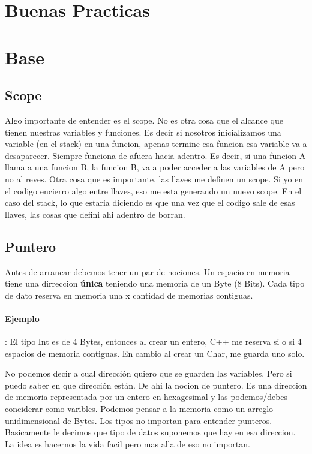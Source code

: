 \documentclass[11pt]{article}
\begin{document}
\tableofcontents
\section{Buenas Practicas}
\section{Base}
\subsection{Scope}
Algo importante de entender es el scope.
No es otra cosa que el alcance que tienen nuestras variables y funciones.
Es decir si nosotros inicializamos una variable (en el stack) en una funcion,
apenas termine esa funcion esa variable va a desaparecer.
Siempre funciona de afuera hacia adentro.
Es decir, si una funcion A llama a una funcion B, la funcion B, va a poder
acceder a las variables de A pero no al reves.
Otra cosa que es importante, las llaves {}  me definen un scope.
Si yo en el codigo encierro algo entre llaves, eso me esta generando un nuevo scope.
En el caso del stack, lo que estaria diciendo es que una vez que el codigo sale
de esas llaves, las cosas que defini ahi adentro de borran.


\subsection{Puntero}
Antes de arrancar debemos tener un par de nociones.
Un espacio en memoria tiene una dirreccion \textbf{\'unica}
teniendo una memoria de un Byte (8 Bits).
Cada tipo de dato reserva en memoria una x cantidad de memorias contiguas.

\paragraph{Ejemplo}: El tipo Int es de 4 Bytes, entonces al crear un entero, C++
me reserva si o si 4 espacios de memoria contiguas.
En cambio al crear un Char, me guarda uno solo.
\vspace{.5cm}

No podemos decir a cual dirección quiero que se guarden las variables.
Pero si puedo saber en que dirección están.
De ahi la nocion de puntero.
 Es una direccion de memoria representada por un entero en
hexagesimal y las podemos/debes conciderar como varibles.
Podemos pensar a la memoria como un arreglo unidimensional de Bytes.
Los tipos no importan para entender punteros.
Basicamente le decimos que tipo de datos suponemos que hay en esa direccion.
La idea es hacernos la vida facil pero mas alla de eso no importan.
\end{document}
